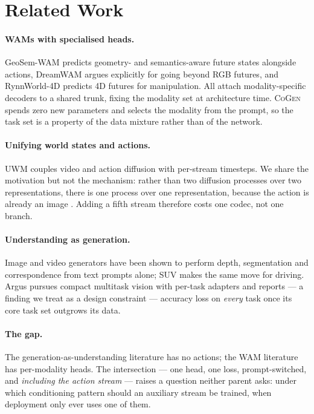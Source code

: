 \documentclass{article} %
\newcommand{\method}{\textsc{CoGen}}
\begin{document}
\section{Related Work}

\paragraph{WAMs with specialised heads.}
GeoSem-WAM \citep{ma2026geosem} predicts geometry- and semantics-aware future states alongside
actions, DreamWAM \citep{yuan2026dreamwam} argues explicitly for going beyond RGB futures, and
RynnWorld-4D \citep{zhao2026rynnworld} predicts 4D futures for manipulation. All attach
modality-specific decoders to a shared trunk, fixing the modality set at architecture time.
\method{} spends zero new parameters and selects the modality from the prompt, so the task set is
a property of the data mixture rather than of the network.

\paragraph{Unifying world states and actions.}
UWM \citep{zhu2025unified} couples video and action diffusion with per-stream timesteps. We share
the motivation but not the mechanism: rather than two diffusion processes over two
representations, there is one process over one representation, because the action is already an
image \citep{zhen2026action}. Adding a fifth stream therefore costs one codec, not one branch.

\paragraph{Understanding as generation.}
Image \citep{gabeur2026image} and video \citep{wang2026video} generators have been shown to
perform depth, segmentation and correspondence from text prompts alone; SUV \citep{yuan2026suv}
makes the same move for driving. Argus \citep{zhuang2025argus} pursues compact multitask vision
with per-task adapters and reports --- a finding we treat as a design constraint --- accuracy loss
on \emph{every} task once its core task set outgrows its data.

\paragraph{The gap.}
The generation-as-understanding literature has no actions; the WAM literature has per-modality
heads. The intersection --- one head, one loss, prompt-switched, and \emph{including the action
stream} --- raises a question neither parent asks: under which conditioning pattern should an
auxiliary stream be trained, when deployment only ever uses one of them.
\end{document}
